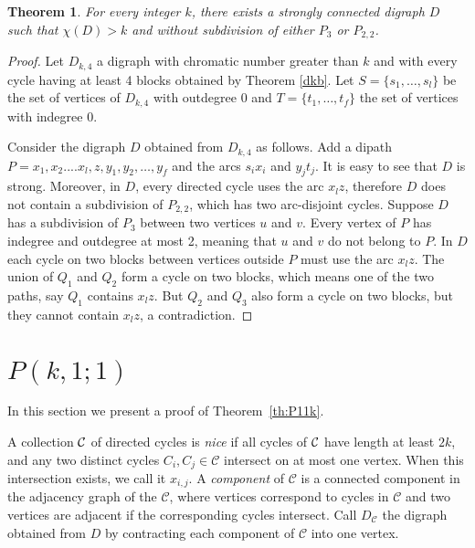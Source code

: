 \documentclass[utf8,10pt]{article}
\theoremstyle{plain}
\newtheorem{theorem}{Theorem}
\theoremstyle{definition}
\theoremstyle{remark}
\begin{document}
\begin{theorem}
For every integer $k$, there exists a strongly connected digraph $D$ such that $\chi(D) >k$ and without subdivision of either $P_3$ or $P_{2,2}$. 
\end{theorem}

\begin{proof}
Let $D_{k,4}$ a digraph with chromatic number greater than $k$ and with every cycle having at least 4 blocks obtained by Theorem \ref{dkb}.
Let $S = \{s_1, \dots,  s_l\}$ be the set of vertices of $D_{k,4}$ with outdegree 0 and $T = \{t_1, \dots, t_f\}$ the set of vertices with indegree 0.

Consider the digraph $D$ obtained from $D_{k,4}$ as follows. Add a dipath  $P = x_1,x_2....x_l,z,y_1,y_2,\dots, y_f$ and the arcs $s_ix_i$ and
$y_jt_j$. It is easy to see that $D$ is strong.
Moreover, in $D$, every directed cycle uses the arc $x_lz$, therefore $D$ does not contain a subdivision of $P_{2,2}$, which has two arc-disjoint cycles. 
Suppose $D$ has a subdivision of $P_3$ between two vertices $u$ and $v$. Every vertex of $P$ has indegree and outdegree at most 2, meaning that $u$ and $v$ do not
belong to $P$. In $D$ each cycle on two blocks between vertices outside $P$ must use the arc $x_lz$. The union of $Q_1$ and $Q_2$ form a cycle on two blocks, 
which means one of the two paths, say $Q_1$ contains $x_lz$. But $Q_2$ and $Q_3$ also form a cycle on two blocks, but they cannot contain $x_lz$, a contradiction.
\end{proof}




\section{$P(k,1;1)$}\label{sec:k,1,1}


In this section we present a proof of Theorem~\ref{th:P11k}.

A collection ${\cal C}$ of directed cycles is {\it nice} if all cycles of ${\cal C}$ have length at least $2k$, and
any two distinct cycles $C_i,C_j\in\mathcal C$ intersect on at most one vertex. When this intersection exists, we call it $x_{i,j}$.
A {\it component} of $\mathcal{C}$ is a connected component in the adjacency graph of the $\mathcal{C}$, where vertices correspond to cycles in $\mathcal{C}$
and two vertices are adjacent if the corresponding cycles intersect. 
Call $D_{\mathcal{C}}$ the digraph obtained from $D$ by contracting each component of $\mathcal{C}$ into one vertex. 
\end{document}
